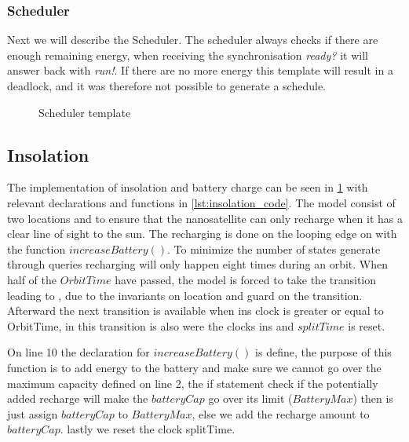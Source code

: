 \subsubsection*{Scheduler}
Next we will describe the Scheduler. The scheduler always checks if there are enough remaining energy, when receiving the synchronisation \textit{ready?} it will answer back with \textit{run!}. If there are no more energy this template will result in a deadlock, and it was therefore not possible to generate a schedule.

\begin{figure}[H]
	\centering
	\caption{Scheduler template}
	\label{fig:cora_inso}
\end{figure}


\subsection*{Insolation}
The implementation of insolation and battery charge can be seen in \cref{fig:cora_inso} with relevant declarations and functions in \cref{lst:insolation_code}. The model consist of two locations  and  to ensure that the nanosatellite can only recharge when it has a clear line of sight to the sun. The recharging is done on the looping edge on  with the function $increaseBattery()$. To minimize the number of states generate through queries recharging will only happen eight times during an orbit. When half of the $OrbitTime$ have passed, the model is forced to take the transition leading to , due to the invariants on  location and guard on the transition. Afterward the next transition is available when ins clock is greater or equal to OrbitTime, in this transition is also were the clocks ins and $splitTime$ is reset.

On line 10 the declaration for $increaseBattery()$ is define, the purpose of this function is to add energy to the battery and make sure we cannot go over the maximum capacity defined on line 2, the if statement check if the potentially added recharge will make the $batteryCap$ go over its limit ($BatteryMax$) then is just assign $batteryCap$ to $BatteryMax$, else we add the recharge amount to $batteryCap$. lastly we reset the clock splitTime.

